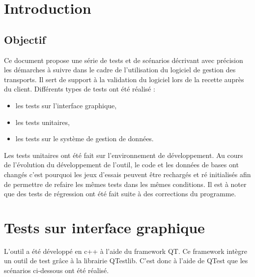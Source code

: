 \documentclass[11pt,fleqn]{report}
\begin{document}
    
\ZMakeCover



\chapter{Introduction}
\section{Objectif}
Ce document propose une série de tests et de scénarios décrivant avec précision les démarches à suivre dans le cadre de l’utilisation du logiciel de gestion des transports. Il sert de support à la validation du logiciel lors de la recette auprès du client.
Différents types de tests ont été réalisé : 
\begin{itemize}
\item les tests sur l'interface graphique,
\item les tests unitaires,
\item les tests sur le système de gestion de données.
\end{itemize}
Les tests unitaires ont été fait sur l’environnement de développement. 
Au cours de l’évolution du développement de l'outil, le code et les données de bases ont changés c'est pourquoi les jeux d’essais peuvent être rechargés  et ré initialisés afin de permettre de refaire les mêmes tests dans les mêmes conditions. 
Il est à noter que des tests de régression ont été fait suite à des corrections du programme.

\chapter{Tests sur interface graphique}
L'outil a été développé en c++ à l'aide du framework QT. Ce framework intègre un outil de test grâce à la librairie QTestlib.
C'est donc à l'aide de QTest que les scénarios ci-dessous ont été réalisé.
\end{document}
